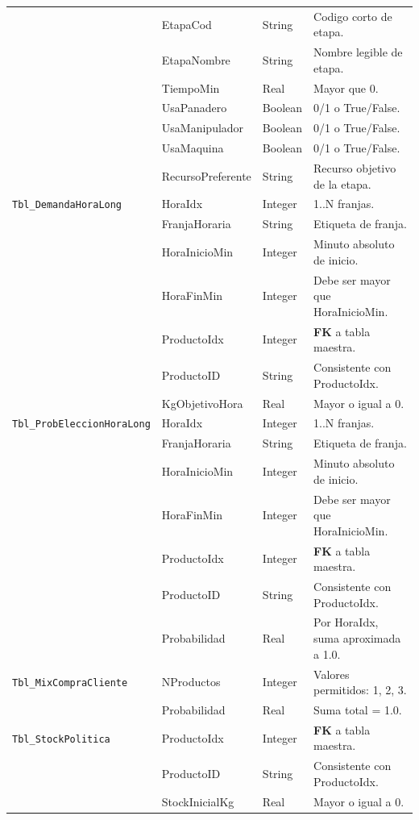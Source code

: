 \documentclass[11pt]{article}
\newcommand{\tabla}[1]{\texttt{#1}}
\begin{document}
{\begin{longtable}{L{4.2cm}L{3.0cm}L{1.9cm}L{4.7cm}}
 & EtapaCod & String & Codigo corto de etapa. \\
 & EtapaNombre & String & Nombre legible de etapa. \\
 & TiempoMin & Real & Mayor que 0. \\
 & UsaPanadero & Boolean & 0/1 o True/False. \\
 & UsaManipulador & Boolean & 0/1 o True/False. \\
 & UsaMaquina & Boolean & 0/1 o True/False. \\
 & RecursoPreferente & String & Recurso objetivo de la etapa. \\
\tabla{Tbl\_DemandaHoraLong} & HoraIdx & Integer & 1..N franjas. \\
 & FranjaHoraria & String & Etiqueta de franja. \\
 & HoraInicioMin & Integer & Minuto absoluto de inicio. \\
 & HoraFinMin & Integer & Debe ser mayor que HoraInicioMin. \\
 & ProductoIdx & Integer & \textbf{FK} a tabla maestra. \\
 & ProductoID & String & Consistente con ProductoIdx. \\
 & KgObjetivoHora & Real & Mayor o igual a 0. \\
\tabla{Tbl\_ProbEleccionHoraLong} & HoraIdx & Integer & 1..N franjas. \\
 & FranjaHoraria & String & Etiqueta de franja. \\
 & HoraInicioMin & Integer & Minuto absoluto de inicio. \\
 & HoraFinMin & Integer & Debe ser mayor que HoraInicioMin. \\
 & ProductoIdx & Integer & \textbf{FK} a tabla maestra. \\
 & ProductoID & String & Consistente con ProductoIdx. \\
 & Probabilidad & Real & Por HoraIdx, suma aproximada a 1.0. \\
\tabla{Tbl\_MixCompraCliente} & NProductos & Integer & Valores permitidos: 1, 2, 3. \\
 & Probabilidad & Real & Suma total = 1.0. \\
\tabla{Tbl\_StockPolitica} & ProductoIdx & Integer & \textbf{FK} a tabla maestra. \\
 & ProductoID & String & Consistente con ProductoIdx. \\
 & StockInicialKg & Real & Mayor o igual a 0. \\

\end{longtable}}
\end{document}
